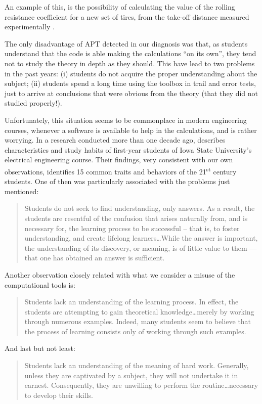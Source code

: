 \documentclass[10pt]{SelfArx} %
\begin{document}
An example of this, is the possibility of calculating the value of the rolling resistance coefficient for a new set of tires, from the take-off distance measured experimentally . 

The only  disadvantage of APT detected in our diagnosis was that, as students understand that the {code} is able making  the calculations ``on its own'', they tend not to study the theory in depth as they should. This have lead to two  problems in the past years:  (i) students do not acquire the proper understanding about the subject; (ii) students spend a long time using the toolbox in trail and error tests, just to arrive at  conclusions that were obvious  from the theory (that they did not studied properly!). 

Unfortunately, this situation seems to be commonplace in modern engineering courses, whenever a software is available to help in the calculations, and is rather worrying. In a  research  conducted more than one decade ago, \cite{mina} describes characteristics and study habits of first-year students of Iowa State University’s electrical engineering course. Their findings, very consistent with our own observations, identifies 15 common traits and behaviors of the 21\textsuperscript{st} century students. One of then was particularly associated with the problems just mentioned:
\begin{quote}
Students do not seek to find understanding, only answers. As a result, the students are resentful of the confusion that arises naturally from, and is necessary for, the learning process to be successful – that is, to foster understanding, and create lifelong learners\ldots While the answer is important, the understanding of its discovery, or meaning,
is of little value to them --- that one has obtained an answer is sufficient.
\end{quote}

Another observation closely related  with what we consider a misuse of the computational tools is:
\begin{quote}
Students lack an understanding of the learning process. In effect, the students are attempting to gain theoretical
knowledge\ldots merely by working through numerous examples. Indeed, many students seem to believe that the process of learning consists only of working through such examples. 
\end{quote}

And last but not least:
\begin{quote}
Students lack an understanding of the meaning of hard work. Generally, unless they are captivated by a subject, they will not undertake it in earnest. Consequently, they are unwilling to perform the routine\ldots necessary to develop their skills.
\end{quote}
\end{document}
